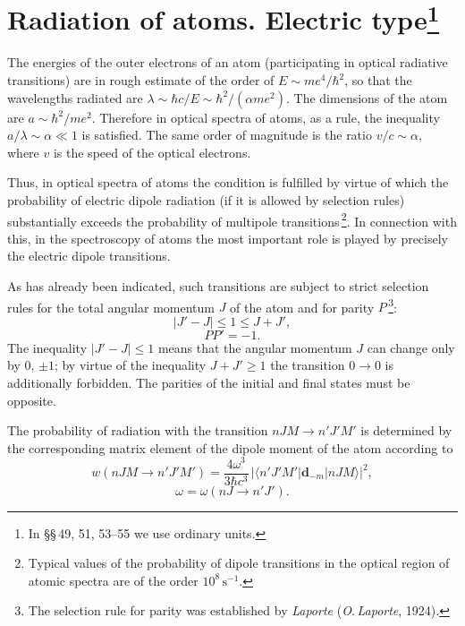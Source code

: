 \section{Radiation of atoms. Electric type\protect\footnote{In \S\S\,49, 51, 53--55 we use ordinary units.}}

The energies of the outer electrons of an atom (participating in optical radiative transitions) are in rough estimate of the order of $E \sim me^4/\hbar^2$, so that the wavelengths radiated are $\lambda \sim \hbar c/E \sim \hbar^2/(\alpha me^2)$. The dimensions of the atom are $a \sim \hbar^2/me^2$. Therefore in optical spectra of atoms, as a rule, the inequality $a/\lambda \sim \alpha \ll 1$ is satisfied. The same order of magnitude is the ratio $v/c \sim \alpha$, where $v$ is the speed of the optical electrons.

Thus, in optical spectra of atoms the condition is fulfilled by virtue of which the probability of electric dipole radiation (if it is allowed by selection rules) substantially exceeds the probability of multipole transitions\,\footnote{Typical values of the probability of dipole transitions in the optical region of atomic spectra are of the order $10^8\,\text{s}^{-1}$.}. In connection with this, in the spectroscopy of atoms the most important role is played by precisely the electric dipole transitions.

As has already been indicated, such transitions are subject to strict selection rules for the total angular momentum $J$ of the atom and for parity $P$\,\footnote{The selection rule for parity was established by \textit{Laporte} (\textit{O.\,Laporte}, 1924).}:
\begin{equation}
|J' - J| \leqslant 1 \leqslant J + J',
\tag{49.1}
\end{equation}
\begin{equation}
PP' = -1.
\tag{49.2}
\end{equation}
The inequality $|J' - J| \leqslant 1$ means that the angular momentum $J$ can change only by $0$, $\pm 1$; by virtue of the inequality $J + J' \geqslant 1$ the transition $0 \to 0$ is additionally forbidden. The parities of the initial and final states must be opposite.

The probability of radiation with the transition $nJM \to n'J'M'$ is determined by the corresponding matrix element of the dipole moment of the atom according to
\begin{equation}
w(nJM \to n'J'M') = \frac{4\omega^3}{3\hbar c^3}\,|\langle n'J'M'|\mathbf{d}_{-m}|nJM\rangle|^2,
\tag{49.3}
\end{equation}
\[
\omega = \omega(nJ \to n'J').
\]

